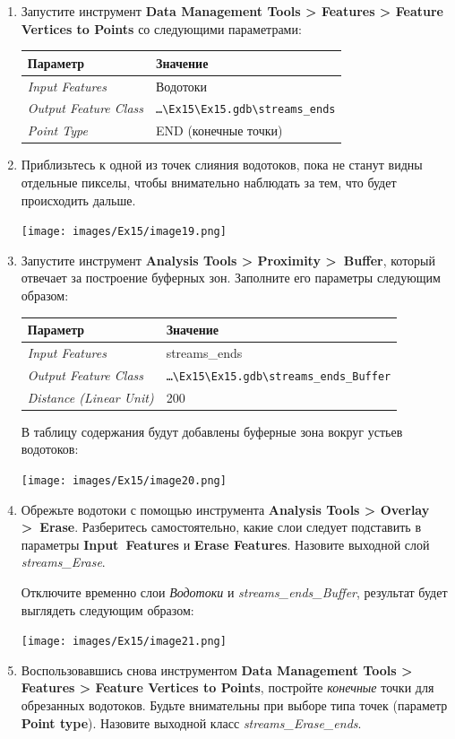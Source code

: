 \documentclass[12pt,]{book}
\begin{document}
\begin{enumerate}
\def\labelenumi{\arabic{enumi}.}
\item
  Запустите инструмент \textbf{Data Management Tools \textgreater{} Features \textgreater{} Feature Vertices to Points} со следующими параметрами:

  \begin{longtable}[]{@{}ll@{}}
  \toprule
  Параметр & Значение\tabularnewline
  \midrule
  \endhead
  \emph{Input Features} & Водотоки\tabularnewline
  \emph{Output Feature Class} & \texttt{\ldots{}\textbackslash{}Ex15\textbackslash{}Ex15.gdb\textbackslash{}streams\_ends}\tabularnewline
  \emph{Point Type} & END (конечные точки)\tabularnewline
  \bottomrule
  \end{longtable}
\item
  Приблизьтесь к одной из точек слияния водотоков, пока не станут видны отдельные пикселы, чтобы внимательно наблюдать за тем, что будет происходить дальше.

  \texttt{[image: images/Ex15/image19.png]}
\item
  Запустите инструмент \textbf{Analysis Tools \textgreater{} Proximity \textgreater~Buffer}, который отвечает за построение буферных зон. Заполните его параметры следующим образом:

  \begin{longtable}[]{@{}ll@{}}
  \toprule
  Параметр & Значение\tabularnewline
  \midrule
  \endhead
  \emph{Input Features} & streams\_ends\tabularnewline
  \emph{Output Feature Class} & \texttt{\ldots{}\textbackslash{}Ex15\textbackslash{}Ex15.gdb\textbackslash{}streams\_ends\_Buffer}\tabularnewline
  \emph{Distance (Linear Unit)} & 200\tabularnewline
  \bottomrule
  \end{longtable}

  В таблицу содержания будут добавлены буферные зона вокруг устьев водотоков:

  \texttt{[image: images/Ex15/image20.png]}
\item
  Обрежьте водотоки с помощью инструмента \textbf{Analysis Tools \textgreater{} Overlay \textgreater~Erase}. Разберитесь самостоятельно, какие слои следует подставить в параметры \textbf{Input~Features} и \textbf{Erase Features}. Назовите выходной слой \emph{streams\_Erase}.

  Отключите временно слои \emph{Водотоки} и \emph{streams\_ends\_Buffer}, результат будет выглядеть следующим образом:

  \texttt{[image: images/Ex15/image21.png]}
\item
  Воспользовавшись снова инструментом \textbf{Data Management Tools \textgreater{} Features \textgreater{} Feature Vertices to Points}, постройте \emph{конечные} точки для обрезанных водотоков. Будьте внимательны при выборе типа точек (параметр \textbf{Point type}). Назовите выходной класс \emph{streams\_Erase\_ends}.


\end{enumerate}
\end{document}

